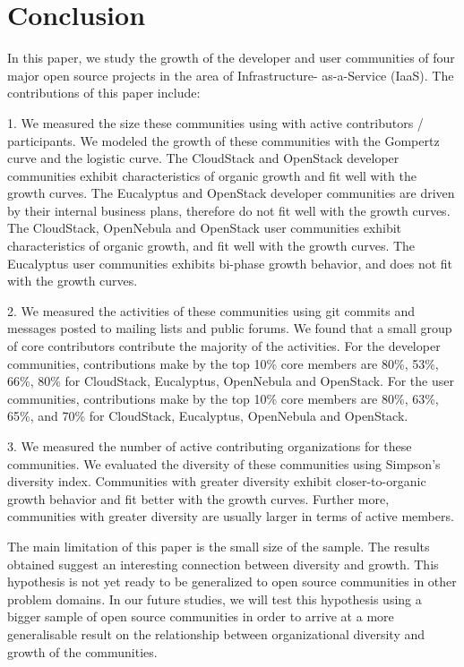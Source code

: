 \documentclass[conference]{IEEEtran}
\begin{document}
\section{Conclusion}
\label{sec:conclusion}

In this paper, we study the growth of the developer and user communities of four major open source projects in the area of Infrastructure- as-a-Service (IaaS). The contributions of this paper include:

1. We measured the size these communities using with active contributors / participants. We modeled the growth of these communities with the Gompertz curve and the logistic curve. The CloudStack and OpenStack developer communities exhibit characteristics of organic growth and fit well with the growth curves. The Eucalyptus and OpenStack developer communities are driven by their internal business plans, therefore do not fit well with the growth curves. The CloudStack, OpenNebula and OpenStack user communities exhibit characteristics of organic growth, and fit well with the growth curves. The Eucalyptus user communities exhibits bi-phase growth behavior, and does not fit with the growth curves.

2. We measured the activities of these communities using git commits and messages posted to mailing lists and public forums. We found that a small group of core contributors contribute the majority of the activities. For the developer communities, contributions make by the top 10\% core members are 80\%, 53\%, 66\%, 80\% for CloudStack, Eucalyptus, OpenNebula and OpenStack. For the user communities, contributions make by the top 10\% core members are 80\%, 63\%, 65\%, and 70\% for CloudStack, Eucalyptus, OpenNebula and OpenStack. 

3. We measured the number of active contributing organizations for these communities. We evaluated the diversity of these communities using Simpson’s diversity index. Communities with greater diversity exhibit closer-to-organic growth behavior and fit better with the growth curves. Further more, communities with greater diversity are usually larger in terms of active members.

The main limitation of this paper is the small size of the sample. The results obtained suggest an interesting connection between diversity and growth. This hypothesis is not yet ready to be generalized to open source communities in other problem domains. In our future studies, we will test this hypothesis using a bigger sample of open source communities in order to arrive at a more generalisable result on the relationship between organizational diversity and growth of the communities.
\end{document}
